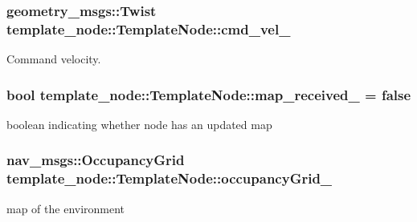 \subsubsection[{\texorpdfstring{cmd\+\_\+vel\+\_\+}{cmd_vel_}}]{\setlength{\rightskip}{0pt plus 5cm}geometry\+\_\+msgs\+::\+Twist template\+\_\+node\+::\+Template\+Node\+::cmd\+\_\+vel\+\_\+}\hypertarget{classtemplate__node_1_1TemplateNode_ae7b69f24d3ad1c71db7b28d29e446f18}{}\label{classtemplate__node_1_1TemplateNode_ae7b69f24d3ad1c71db7b28d29e446f18}


Command velocity. 

\subsubsection[{\texorpdfstring{map\+\_\+received\+\_\+}{map_received_}}]{\setlength{\rightskip}{0pt plus 5cm}bool template\+\_\+node\+::\+Template\+Node\+::map\+\_\+received\+\_\+ = false}\hypertarget{classtemplate__node_1_1TemplateNode_a2cfed3d8b82b7f1dfb6340a6537afda9}{}\label{classtemplate__node_1_1TemplateNode_a2cfed3d8b82b7f1dfb6340a6537afda9}


boolean indicating whether node has an updated map 

\subsubsection[{\texorpdfstring{occupancy\+Grid\+\_\+}{occupancyGrid_}}]{\setlength{\rightskip}{0pt plus 5cm}nav\+\_\+msgs\+::\+Occupancy\+Grid template\+\_\+node\+::\+Template\+Node\+::occupancy\+Grid\+\_\+}\hypertarget{classtemplate__node_1_1TemplateNode_a757ce09640ae3a1b6bb56e048c940b85}{}\label{classtemplate__node_1_1TemplateNode_a757ce09640ae3a1b6bb56e048c940b85}


map of the environment 

